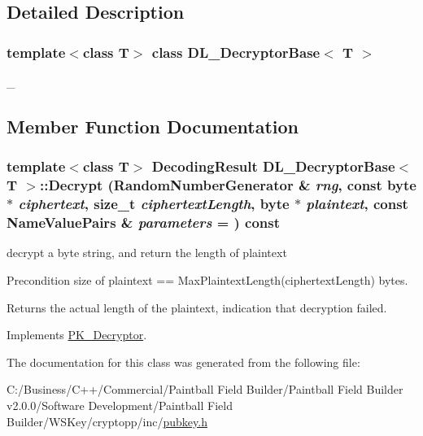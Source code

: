 \subsection{Detailed Description}
\subsubsection*{template$<$class T$>$ class DL\_\-DecryptorBase$<$ T $>$}

\_\- 

\subsection{Member Function Documentation}
\hypertarget{class_d_l___decryptor_base_a5a23bde8893b76023182413d24f75b74}{
\subsubsection[{Decrypt}]{\setlength{\rightskip}{0pt plus 5cm}template$<$class T$>$ {\bf DecodingResult} {\bf DL\_\-DecryptorBase}$<$ T $>$::Decrypt ({\bf RandomNumberGenerator} \& {\em rng}, \/  const byte $\ast$ {\em ciphertext}, \/  size\_\-t {\em ciphertextLength}, \/  byte $\ast$ {\em plaintext}, \/  const {\bf NameValuePairs} \& {\em parameters} = {}) const}}
\label{class_d_l___decryptor_base_a5a23bde8893b76023182413d24f75b74}


decrypt a byte string, and return the length of plaintext \begin{DoxyPrecond}{Precondition}
size of plaintext == MaxPlaintextLength(ciphertextLength) bytes. 
\end{DoxyPrecond}
\begin{DoxyReturn}{Returns}
the actual length of the plaintext, indication that decryption failed. 
\end{DoxyReturn}


Implements \hyperlink{class_p_k___decryptor_ab7466675ed050c440c16508f8a88cac1}{PK\_\-Decryptor}.

The documentation for this class was generated from the following file:\begin{DoxyCompactItemize}
\item 
C:/Business/C++/Commercial/Paintball Field Builder/Paintball Field Builder v2.0.0/Software Development/Paintball Field Builder/WSKey/cryptopp/inc/\hyperlink{pubkey_8h}{pubkey.h}\end{DoxyCompactItemize}
